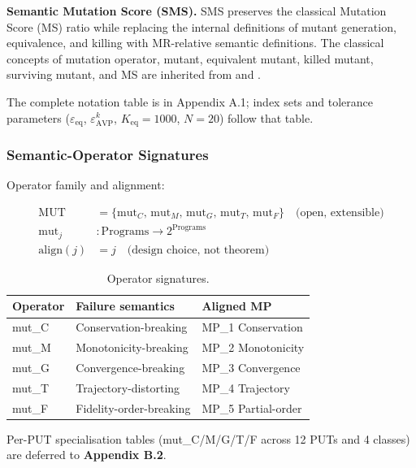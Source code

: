\documentclass[12pt]{article}
\begin{document}
\textbf{Semantic Mutation Score (SMS).} SMS preserves the classical
Mutation Score (MS) ratio while replacing the internal definitions of
mutant generation, equivalence, and killing with MR-relative semantic
definitions. The classical concepts of mutation operator, mutant,
equivalent mutant, killed mutant, surviving mutant, and MS are inherited
from \citet{d7c38286734419b52de4262c9802ebdfcf4b9447} and
\citet{ammann2008introduction}.

The complete notation table is in Appendix A.1; index sets and tolerance
parameters ($\varepsilon_{\mathrm{eq}}$, $\varepsilon_{\mathrm{AVP}}^k$,
$K_{\mathrm{eq}} = 1000$, $N = 20$) follow that table.

\subsubsection{Semantic-Operator Signatures}\label{operator-signatures}

Operator family and alignment:

\begin{align*}
\mathrm{MUT} &= \{\mathrm{mut}_C,\, \mathrm{mut}_M,\, \mathrm{mut}_G,\, \mathrm{mut}_T,\, \mathrm{mut}_F\} \quad \text{(open, extensible)} \\
\mathrm{mut}_j &: \text{Programs} \to 2^{\text{Programs}} \\
\mathrm{align}(j) &= j \quad \text{(design choice, not theorem)}
\end{align*}

\begin{table}[t]
\caption{Operator signatures.}\label{tab:p2-01}
\centering
\begin{tabular}{@{}lll@{}}
\toprule
Operator & Failure semantics & Aligned MP \\
\midrule
mut\_C & Conservation-breaking & MP\_1 Conservation \\
mut\_M & Monotonicity-breaking & MP\_2 Monotonicity \\
mut\_G & Convergence-breaking & MP\_3 Convergence \\
mut\_T & Trajectory-distorting & MP\_4 Trajectory \\
mut\_F & Fidelity-order-breaking & MP\_5 Partial-order \\
\bottomrule
\end{tabular}
\end{table}

Per-PUT specialisation tables (mut\_C/M/G/T/F across 12 PUTs and 4
classes) are deferred to \textbf{Appendix B.2}.
\end{document}
